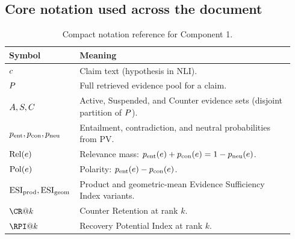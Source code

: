 \subsection{Core notation used across the document}
\begin{table}[H]
\centering
\begin{tabular}{@{}p{0.20\linewidth}p{0.74\linewidth}@{}}
\toprule
Symbol & Meaning \\
\midrule
$c$ & Claim text (hypothesis in NLI). \\
$P$ & Full retrieved evidence pool for a claim. \\
$A,S,C$ & Active, Suspended, and Counter evidence sets (disjoint partition of $P$). \\
$p_{\mathrm{ent}}, p_{\mathrm{con}}, p_{\mathrm{neu}}$ & Entailment, contradiction, and neutral probabilities from PV. \\
$\operatorname{Rel}(e)$ & Relevance mass: $p_{\mathrm{ent}}(e)+p_{\mathrm{con}}(e)=1-p_{\mathrm{neu}}(e)$. \\
$\operatorname{Pol}(e)$ & Polarity: $p_{\mathrm{ent}}(e)-p_{\mathrm{con}}(e)$. \\
$\operatorname{ESI}_{\mathrm{prod}}, \operatorname{ESI}_{\mathrm{geom}}$ & Product and geometric-mean Evidence Sufficiency Index variants. \\
$\CR@k$ & Counter Retention at rank $k$. \\
$\RPI@k$ & Recovery Potential Index at rank $k$. \\
\bottomrule
\end{tabular}
\caption{Compact notation reference for Component 1.}
\label{tab:c1_notation}
\end{table}

